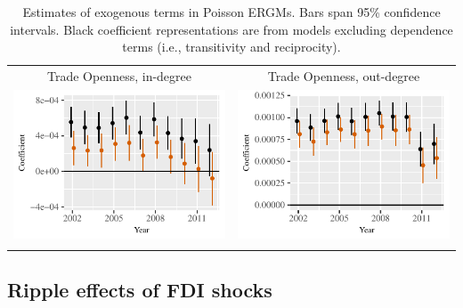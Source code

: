 \documentclass[reqno,onecolumn,letterpaper,12pt]{article}
\begin{document}
\begin{longtable}{c@{\hskip -.4cm}c}
Trade Openness, in-degree &
Trade Openness,  out-degree\\
\includegraphics[height=.2\textheight, clip=true, trim=0cm .5cm 0cm .1cm]{draft_figures/rl_plots/TradeO_in.pdf}  &
\includegraphics[height=.2\textheight, clip=true, trim=.5cm .5cm 0cm .1cm]{draft_figures/rl_plots/TradeO_out.pdf}   \\

\caption{\label{fig:effectPlots1} Estimates of exogenous terms in Poisson ERGMs. Bars span 95\% confidence intervals. Black coefficient representations are from models excluding dependence terms (i.e., transitivity and reciprocity).}

\end{longtable}

\subsection{Ripple effects of FDI shocks}\label{contagion}
\end{document}

